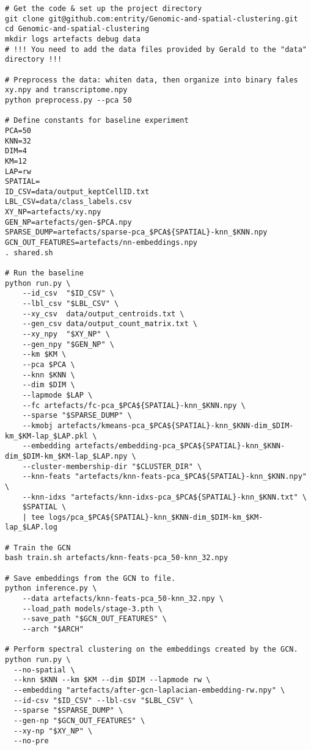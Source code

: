 \documentclass{article}
\begin{document}
\begin{verbatim}
# Get the code & set up the project directory
git clone git@github.com:entrity/Genomic-and-spatial-clustering.git
cd Genomic-and-spatial-clustering
mkdir logs artefacts debug data
# !!! You need to add the data files provided by Gerald to the "data" directory !!!

# Preprocess the data: whiten data, then organize into binary fales xy.npy and transcriptome.npy
python preprocess.py --pca 50

# Define constants for baseline experiment
PCA=50
KNN=32
DIM=4
KM=12
LAP=rw
SPATIAL=
ID_CSV=data/output_keptCellID.txt
LBL_CSV=data/class_labels.csv
XY_NP=artefacts/xy.npy
GEN_NP=artefacts/gen-$PCA.npy
SPARSE_DUMP=artefacts/sparse-pca_$PCA${SPATIAL}-knn_$KNN.npy
GCN_OUT_FEATURES=artefacts/nn-embeddings.npy
. shared.sh

# Run the baseline
python run.py \
	--id_csv  "$ID_CSV" \
	--lbl_csv "$LBL_CSV" \
	--xy_csv  data/output_centroids.txt \
	--gen_csv data/output_count_matrix.txt \
	--xy_npy  "$XY_NP" \
	--gen_npy "$GEN_NP" \
	--km $KM \
	--pca $PCA \
	--knn $KNN \
	--dim $DIM \
	--lapmode $LAP \
	--fc artefacts/fc-pca_$PCA${SPATIAL}-knn_$KNN.npy \
	--sparse "$SPARSE_DUMP" \
	--kmobj artefacts/kmeans-pca_$PCA${SPATIAL}-knn_$KNN-dim_$DIM-km_$KM-lap_$LAP.pkl \
	--embedding artefacts/embedding-pca_$PCA${SPATIAL}-knn_$KNN-dim_$DIM-km_$KM-lap_$LAP.npy \
	--cluster-membership-dir "$CLUSTER_DIR" \
	--knn-feats "artefacts/knn-feats-pca_$PCA${SPATIAL}-knn_$KNN.npy" \
	--knn-idxs "artefacts/knn-idxs-pca_$PCA${SPATIAL}-knn_$KNN.txt" \
	$SPATIAL \
	| tee logs/pca_$PCA${SPATIAL}-knn_$KNN-dim_$DIM-km_$KM-lap_$LAP.log

# Train the GCN
bash train.sh artefacts/knn-feats-pca_50-knn_32.npy

# Save embeddings from the GCN to file.
python inference.py \
	--data artefacts/knn-feats-pca_50-knn_32.npy \
	--load_path models/stage-3.pth \
	--save_path "$GCN_OUT_FEATURES" \
	--arch "$ARCH"

# Perform spectral clustering on the embeddings created by the GCN.
python run.py \
  --no-spatial \
  --knn $KNN --km $KM --dim $DIM --lapmode rw \
  --embedding "artefacts/after-gcn-laplacian-embedding-rw.npy" \
  --id-csv "$ID_CSV" --lbl-csv "$LBL_CSV" \
  --sparse "$SPARSE_DUMP" \
  --gen-np "$GCN_OUT_FEATURES" \
  --xy-np "$XY_NP" \
  --no-pre
\end{verbatim}
\end{document}
